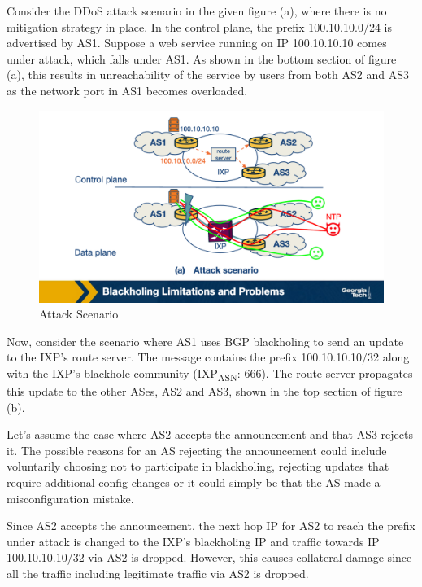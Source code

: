 \documentclass[11pt]{article}
\begin{document}
Consider the DDoS attack scenario in the given figure (a), where there is no mitigation strategy in place. In the control plane, the prefix 100.10.10.0/24 is advertised by AS1. Suppose a web service running on IP 100.10.10.10 comes under attack, which falls under AS1. As shown in the bottom section of figure (a), this results in unreachability of the service by users from both AS2 and AS3 as the network port in AS1 becomes overloaded. 

\begin{figure}[htbp]
\centering
\includegraphics[width=.9\linewidth]{./MD_Figures/9_bgp_blackholing_attack_scenario.png}
\caption{\label{fig:org6edf63e}Attack Scenario}
\end{figure}

Now, consider the scenario where AS1 uses BGP blackholing to send an update to the IXP’s route server. The message contains the prefix 100.10.10.10/32 along with the IXP’s blackhole community (IXP\textsubscript{ASN}: 666). The route server propagates this update to the other ASes, AS2 and AS3, shown in the top section of figure (b). 

Let's assume the case where AS2 accepts the announcement and that AS3 rejects it. The possible reasons for an AS rejecting the announcement could include voluntarily choosing not to participate in blackholing, rejecting updates that require additional config changes or it could simply be that the AS made a misconfiguration mistake. 

Since AS2 accepts the announcement, the next hop IP for AS2 to reach the prefix under attack is changed to the IXP’s blackholing IP and traffic towards IP 100.10.10.10/32 via AS2 is dropped. However, this causes collateral damage since all the traffic including legitimate traffic via AS2 is dropped. 
\end{document}
